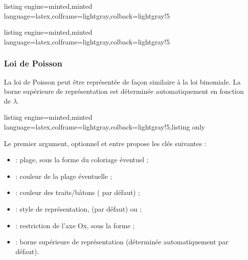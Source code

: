 \documentclass[11pt,a4paper]{ltxdoc}
\begin{document}
\begin{tcblisting}{listing engine=minted,minted language=latex,colframe=lightgray,colback=lightgray!5}
\begin{GraphiqueTikz}[x=0.2cm,y=50cm,Origx=-0.5,Xmin=-0.5,Xmax=50.5,
  Xgrille=5,Xgrilles=1,Ymin=0,Ymax=0.12,Ygrille=0.01,Ygrilles=0.001]
\end{GraphiqueTikz}
\end{tcblisting}

\begin{tcblisting}{listing engine=minted,minted language=latex,colframe=lightgray,colback=lightgray!5}
\begin{GraphiqueTikz}[x=0.5cm,y=100cm,Origx=14.5,Xmin=14.5,Xmax=35.5,
  Xgrille=5,Xgrilles=1,Ymin=0,Ymax=0.09,Ygrille=0.01,Ygrilles=0.001]
\end{GraphiqueTikz}
\end{tcblisting}

\subsubsection{Loi de Poisson}\label{loipoisson}
La loi de Poisson peut être représentée de façon similaire à la loi binomiale. La borne supérieure de représentation est déterminée automatiquement en fonction de $\lambda$.

\begin{tcblisting}{listing engine=minted,minted language=latex,colframe=lightgray,colback=lightgray!5,listing only}
\end{tcblisting}

Le premier argument, optionnel et entre \MontreCode{[...]} propose les clés suivantes :

\begin{itemize}
  \item {} : plage, sous la forme  du coloriage éventuel ;
  \item {} : couleur de la plage éventuelle ;
  \item {} : couleur des traits/bâtons ( par défaut) ;
  \item {} : style de représentation,  (par défaut) ou  ;
  \item {} : restriction de l'axe Ox, sous la forme  ;
  \item {} : borne supérieure de représentation (déterminée automatiquement par défaut).
\end{itemize}
\end{document}
